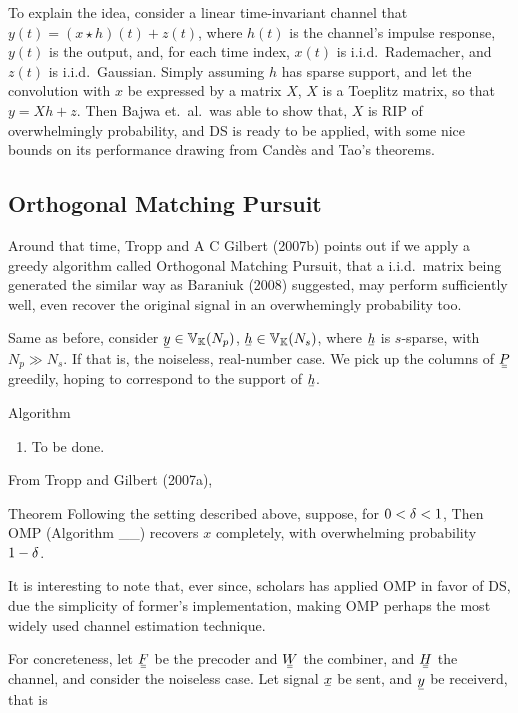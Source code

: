To explain the idea, consider a linear time-invariant channel that \(y(t) =(x \star h)(t) + z(t)\), where \(h(t)\) is the channel's impulse response, \(y(t)\) is the output, and, for each time index, \(x(t)\) is i.i.d.\ Rademacher, and \(z(t)\) is i.i.d.\ Gaussian.
Simply assuming \(h\) has sparse support, and let the convolution with \(x\) be expressed by a matrix \(X\), \(X\) is a Toeplitz matrix, so that \(y =X h +z\).
Then Bajwa et.\ al.\ was able to show that, \(X\) is RIP of overwhelmingly probability, and DS is ready to be applied, with some nice bounds on its performance drawing from Cand\`es and Tao's theorems.

\subsection{Orthogonal Matching Pursuit}

Around that time, Tropp and A C Gilbert (2007b) points out if we apply a greedy algorithm called Orthogonal Matching Pursuit, that a i.i.d.\ matrix being generated the similar way as Baraniuk (2008) suggested, may perform sufficiently well, even recover the original signal in an overwhemingly probability too.

Same as before, consider \(\V{y} \in \MB{V}_\MB{K} (N_p)\), \(\V{h} \in \MB{V}_\MB{K} (N_s)\), where \(\V{h}\) is \(s\)-sparse, with \(N_p \gg N_s\).
If
that is, the noiseless, real-number case.
We pick up the columns of \(\M{P}\) greedily, hoping to correspond to the support of \(\V{h}\).

\Result
{Algorithm}
{
\begin{enumerate}
\item To be done.
\end{enumerate}
}

From Tropp and Gilbert (2007a),

\Result
{Theorem}
{
Following the setting described above, suppose, for \(0 <\delta <1\),
%
%
Then OMP (Algorithm \_\_) recovers \(x\) completely, with overwhelming probability \(1-\delta\).
}

It is interesting to note that, ever since, scholars has applied OMP in favor of DS, due the simplicity of former's implementation, making OMP perhaps the most widely used channel estimation technique.

For concreteness, let \(\M{F}\) be the precoder and \(\M{W}\) the combiner, and \(\M{H}\) the channel, and consider the noiseless case.
Let signal \(\V{x}\) be sent, and \(\V{y}\) be receiverd, that is
%
%

